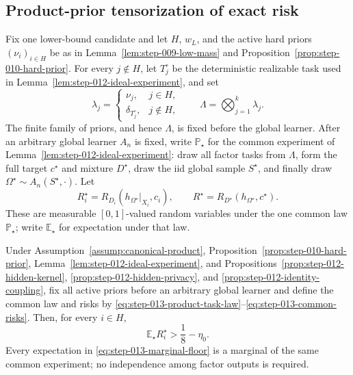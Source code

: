 \subsection{Product-prior tensorization of exact risk}
\label{app:step-013}

Fix one lower-bound candidate and let \(H\), \(w_L\), and the active
hard priors \((\nu_i)_{i\in H}\) be as in
Lemma~\ref{lem:step-009-low-mass} and
Proposition~\ref{prop:step-010-hard-prior}.  For every \(j\notin H\),
let \(T_j^\circ\) be the deterministic realizable task used in
Lemma~\ref{lem:step-012-ideal-experiment}, and set
\begin{equation}\label{eq:step-013-product-task-law}
\lambda_j=
\begin{cases}
\nu_j,&j\in H,\\
\delta_{T_j^\circ},&j\notin H,
\end{cases}
\qquad
\Lambda=\bigotimes_{j=1}^k\lambda_j.
\end{equation}
The finite family of priors, and hence \(\Lambda\), is fixed before the
global learner.  After an arbitrary global learner \(A_n\) is fixed,
write \(\mathbb P_\star\) for the common experiment of
Lemma~\ref{lem:step-012-ideal-experiment}: draw all factor tasks from
\(\Lambda\), form the full target \(c^\star\) and mixture \(D^\star\),
draw the iid global sample \(S^\star\), and finally draw
\(\Omega^\star\sim A_n(S^\star,\cdot)\).  Let
\begin{equation}\label{eq:step-013-common-risks}
R_i^\star
=R_{D_i}(h_{\Omega^\star}|_{X_i},c_i),
\qquad
R^\star
=R_{D^\star}(h_{\Omega^\star},c^\star).
\end{equation}
These are measurable \([0,1]\)-valued random variables under the one
common law \(\mathbb P_\star\); write \(\mathbb E_\star\) for
expectation under that law.

\begin{lemma}
\label{lem:step-013-common-marginal-floors}
Under Assumption~\ref{assump:canonical-product},
Proposition~\ref{prop:step-010-hard-prior},
Lemma~\ref{lem:step-012-ideal-experiment}, and
Propositions~\ref{prop:step-012-hidden-kernel},
\ref{prop:step-012-hidden-privacy}, and
\ref{prop:step-012-identity-coupling}, fix all active priors before an
arbitrary global learner and define the common law and risks by
\eqref{eq:step-013-product-task-law}--\eqref{eq:step-013-common-risks}.
Then, for every \(i\in H\),
\begin{equation}\label{eq:step-013-marginal-floor}
\mathbb E_\star R_i^\star>\frac18-\eta_0.
\end{equation}
Every expectation in \eqref{eq:step-013-marginal-floor} is a marginal
of the same common experiment; no independence among factor outputs is
required.
\end{lemma}

